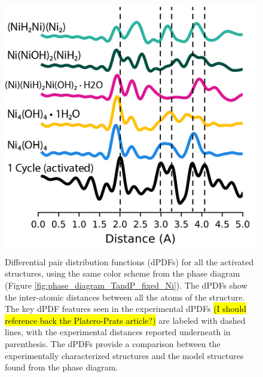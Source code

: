 \documentclass[journal=jctcce,manuscript=article]{achemso}
\begin{document}






\begin{figure}[H]
    \centering
    \includegraphics{zi-images/01-Ni-Graphics/2021-02-25-Ni-fixed-dPDFs-manuscript.png}
    \caption{Differential pair distribution functions (dPDFs) for all the activated structures, using the same color scheme from the  phase diagram (Figure \ref{fig:phase_diagram_TandP_fixed_Ni}). The dPDFs show the inter-atomic distances between all the atoms of the structure. The key dPDF features seen in the experimental dPDFs \hl{(I should reference back the Platero-Prats article?)} are labeled with dashed lines, with the experimental distances reported underneath in parenthesis. The dPDFs provide a comparison between the experimentally characterized structures and the model structures found from the phase diagram.}
    \label{fig:dPDFs_TandP_fixed_Ni}
\end{figure}
\end{document}
